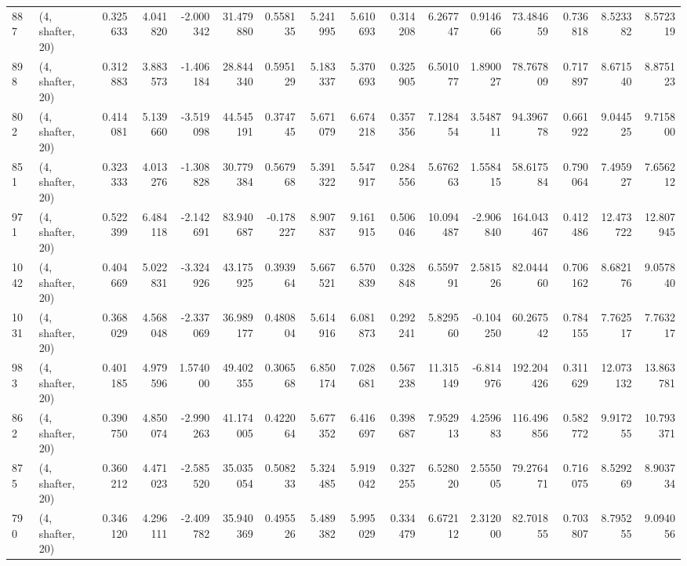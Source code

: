 \begin{tabular}{llrrrrrrrrrrrrrr}
887  &  (4, shafter, 20) &   0.325633 &   4.041820 &  -2.000342 &     31.479880 &    0.558135 &    5.241995 &    5.610693 &  0.314208 &   6.267747 &   0.914666 &    73.484659 &   0.736818 &   8.523382 &   8.572319 \\
898  &  (4, shafter, 20) &   0.312883 &   3.883573 &  -1.406184 &     28.844340 &    0.595129 &    5.183337 &    5.370693 &  0.325905 &   6.501077 &   1.890027 &    78.767809 &   0.717897 &   8.671540 &   8.875123 \\
802  &  (4, shafter, 20) &   0.414081 &   5.139660 &  -3.519098 &     44.545191 &    0.374745 &    5.671079 &    6.674218 &  0.357356 &   7.128454 &   3.548711 &    94.396778 &   0.661922 &   9.044525 &   9.715800 \\
851  &  (4, shafter, 20) &   0.323333 &   4.013276 &  -1.308828 &     30.779384 &    0.567968 &    5.391322 &    5.547917 &  0.284556 &   5.676263 &   1.558415 &    58.617584 &   0.790064 &   7.495927 &   7.656212 \\
971  &  (4, shafter, 20) &   0.522399 &   6.484118 &  -2.142691 &     83.940687 &   -0.178227 &    8.907837 &    9.161915 &  0.506046 &  10.094487 &  -2.906840 &   164.043467 &   0.412486 &  12.473722 &  12.807945 \\
1042 &  (4, shafter, 20) &   0.404669 &   5.022831 &  -3.324926 &     43.175925 &    0.393964 &    5.667521 &    6.570839 &  0.328848 &   6.559791 &   2.581526 &    82.044460 &   0.706162 &   8.682176 &   9.057840 \\
1031 &  (4, shafter, 20) &   0.368029 &   4.568048 &  -2.337069 &     36.989177 &    0.480804 &    5.614916 &    6.081873 &  0.292241 &   5.829560 &  -0.104250 &    60.267542 &   0.784155 &   7.762517 &   7.763217 \\
983  &  (4, shafter, 20) &   0.401185 &   4.979596 &   1.574000 &     49.402355 &    0.306568 &    6.850174 &    7.028681 &  0.567238 &  11.315149 &  -6.814976 &   192.204426 &   0.311629 &  12.073132 &  13.863781 \\
862  &  (4, shafter, 20) &   0.390750 &   4.850074 &  -2.990263 &     41.174005 &    0.422064 &    5.677352 &    6.416697 &  0.398687 &   7.952913 &   4.259683 &   116.496856 &   0.582772 &   9.917255 &  10.793371 \\
875  &  (4, shafter, 20) &   0.360212 &   4.471023 &  -2.585520 &     35.035054 &    0.508233 &    5.324485 &    5.919042 &  0.327255 &   6.528020 &   2.555005 &    79.276471 &   0.716075 &   8.529269 &   8.903734 \\
790  &  (4, shafter, 20) &   0.346120 &   4.296111 &  -2.409782 &     35.940369 &    0.495526 &    5.489382 &    5.995029 &  0.334479 &   6.672112 &   2.312000 &    82.701855 &   0.703807 &   8.795255 &   9.094056 \\

\end{tabular}
